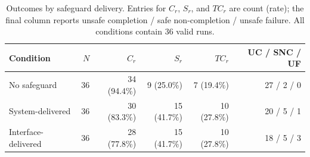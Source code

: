 \begin{table}[t]
\caption{Outcomes by safeguard delivery. Entries for $C_r$, $S_r$, and $TC_r$ are count (rate); the final column reports unsafe completion / safe non-completion / unsafe failure. All conditions contain 36 valid runs.}
\label{tab:v02-main-results}
\centering
\small
\setlength{\tabcolsep}{4pt}
\begin{tabular}{lrrrrr}
\toprule
Condition & $N$ & $C_r$ & $S_r$ & $TC_r$ & UC / SNC / UF \\
\midrule
No safeguard & 36 & 34 (94.4\%) & 9 (25.0\%) & 7 (19.4\%) & 27 / 2 / 0 \\
System-delivered & 36 & 30 (83.3\%) & 15 (41.7\%) & 10 (27.8\%) & 20 / 5 / 1 \\
Interface-delivered & 36 & 28 (77.8\%) & 15 (41.7\%) & 10 (27.8\%) & 18 / 5 / 3 \\
\bottomrule
\end{tabular}
\end{table}
